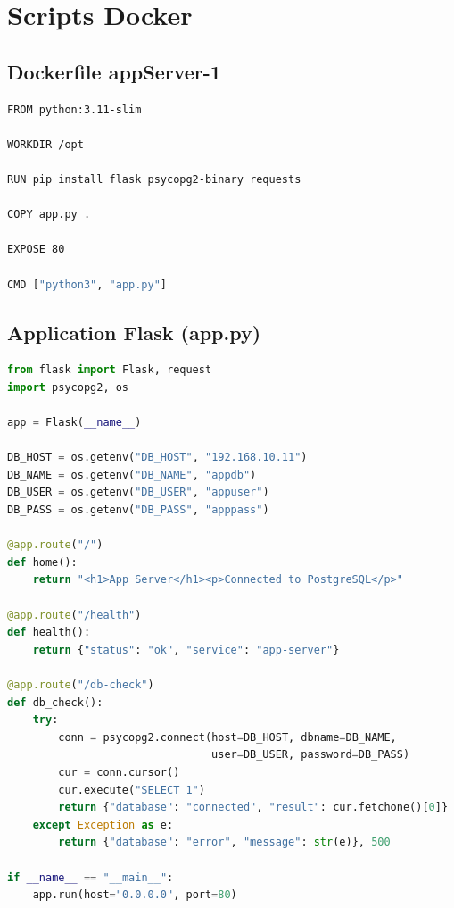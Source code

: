 \chapter{Scripts Docker}
\label{annexe:docker}

\section{Dockerfile appServer-1}

\begin{lstlisting}[language=bash, caption={Dockerfile pour le serveur d'application Flask}]
FROM python:3.11-slim

WORKDIR /opt

RUN pip install flask psycopg2-binary requests

COPY app.py .

EXPOSE 80

CMD ["python3", "app.py"]
\end{lstlisting}

\section{Application Flask (app.py)}

\begin{lstlisting}[language=python, caption={Serveur d'application Flask}]
from flask import Flask, request
import psycopg2, os

app = Flask(__name__)

DB_HOST = os.getenv("DB_HOST", "192.168.10.11")
DB_NAME = os.getenv("DB_NAME", "appdb")
DB_USER = os.getenv("DB_USER", "appuser")
DB_PASS = os.getenv("DB_PASS", "apppass")

@app.route("/")
def home():
    return "<h1>App Server</h1><p>Connected to PostgreSQL</p>"

@app.route("/health")
def health():
    return {"status": "ok", "service": "app-server"}

@app.route("/db-check")
def db_check():
    try:
        conn = psycopg2.connect(host=DB_HOST, dbname=DB_NAME,
                                user=DB_USER, password=DB_PASS)
        cur = conn.cursor()
        cur.execute("SELECT 1")
        return {"database": "connected", "result": cur.fetchone()[0]}
    except Exception as e:
        return {"database": "error", "message": str(e)}, 500

if __name__ == "__main__":
    app.run(host="0.0.0.0", port=80)
\end{lstlisting}


